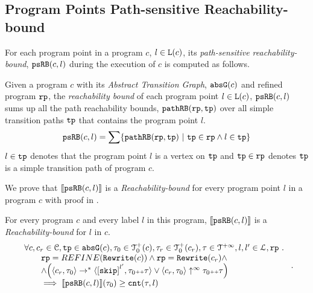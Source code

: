\subsection{Program Points Path-sensitive Reachability-bound}
\label{sec:point-psrb}
For each program point in a program $c$, $l \in \mathtt{L}(c)$,
its \emph{path-sensitive reachability-bound}, $\mathtt{psRB}(c, l)$ during the execution of $c$ is computed as follows.
%
 \begin{defn}
  \label{def:point_psrb}
  Given a program $c$ with its \emph{Abstract Transition Graph}, $\mathtt{abs}{\mathtt{G}}(c)$ and refined program $\mathtt{rp}$,
  the \emph{reachability bound} of each program point $l \in \mathtt{L}(c)$, $\mathtt{psRB}(c, l)$ 
  sums up all the path reachability bounds, $\mathtt{pathRB}(\mathtt{rp}, \mathtt{tp})$ over all simple transition paths $\mathtt{tp}$ that contains the program point $l$.
  \[ 
    \psRB(c, l) = 
    \sum
    \left\{ \inoutB(\rprog, \tpath) ~\vert~ \tpath \in \rprog \land 
    l \in \tpath \right\}
  \]
  $l \in \mathtt{tp}$ denotes that the program point $l$ is a vertex on $\mathtt{tp}$ 
  and $\mathtt{tp} \in \mathtt{rp}$ denotes $\mathtt{tp}$ is a simple transition path of program $c$.
 \end{defn}
We prove that $\llbracket \mathtt{psRB}(c, l) \rrbracket$ is a \emph{Reachability-bound} for every program point $l$ in a program $c$ with proof in .
\begin{thm}
  \label{thm:pathsensitive_rb_soundness}
  For every program ${c}$ and every label $l$ in this program,
  $\llbracket \mathtt{psRB}(c, l) \rrbracket$ is a \emph{Reachability-bound} for $l$ in $c$.
  \[
    \begin{array}{l}
      \forall c, c_r \in \cdom, \tpath \in \absG(c), \trace_0 \in \ftdom_0(c),  \trace_r \in \ftdom_0(c_r), \trace \in \tdom, l, l' \in \ldom, \rprog \st 
      \\ \qquad
      \rprog = REFINE(\algrewrite(c))
      \land 
      \rprog = \algrewrite(c_r)
      \land
      \\ \qquad
      \land
      \Big(
      \config{c_r, \trace_0} \rightarrow^* \config{\clabel{\eskip}^{l'}, \trace_0 \tracecat \trace}
      \lor \config{c_r, \trace_0} \uparrow^{\infty} \trace_0 \tracecat \trace 
      \Big)
      \\ \qquad
      \implies \econfig{\psRB(c, l)}(\trace_0) \geq \counter(\trace, l)
    \end{array}.
  \]
  \end{thm}
